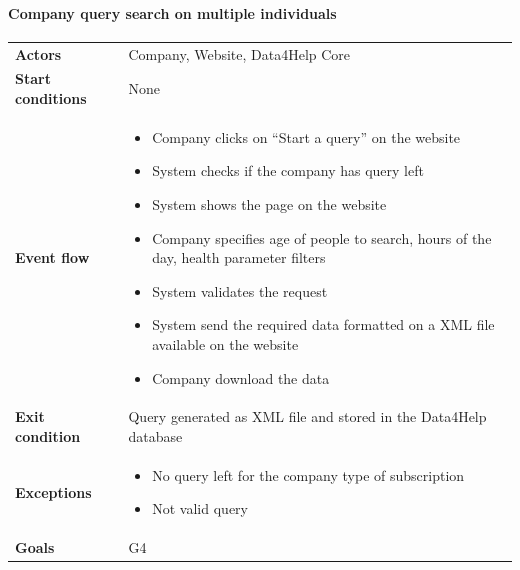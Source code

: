 \paragraph{Company query search on multiple individuals}
\begin{center}
\begin{table}[H]
\centering
\begin{tabular}{l|p{}}
\textbf{Actors} &
Company, Website, Data4Help Core
 \\
\textbf{Start conditions} & None \\
\textbf{Event flow}  &  \begin{minipage}[t]{0.7\textwidth}
    \begin{itemize}
        \item Company clicks on “Start a query” on the website


        \item System checks if the company has query left

        \item System shows the page on the website
        \item Company specifies age of people to search, hours of the day, health parameter filters
 
        \item System validates the request
        \item System send the required data formatted on a XML file available on the website
        \item Company download the data

    \end{itemize}
    
\end{minipage} \\
\textbf{Exit condition} & Query generated as XML file and stored in the Data4Help database \\
\textbf{Exceptions} & \begin{minipage}[t]{0.7\textwidth}
    \begin{itemize}
        \item No query left for the company type of subscription
        \item Not valid query
    \end{itemize}
    
\end{minipage} \\
\textbf{Goals} & G4
\end{tabular}

\end{table}
\end{center}

